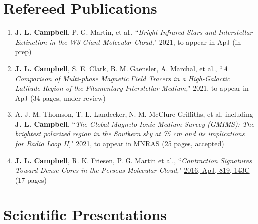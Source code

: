 \documentclass[10pt]{res} %
\begin{document}
\begin{resume}
\section{\Large Refereed Publications}
\vspace{-5pt} %
\noindent\makebox[\linewidth]{\rule{\textwidth}{0.4pt}}
\vspace{-15pt} %

\begin{enumerate}[{start=4,label=\arabic*.\addtocounter{enumi}{-2}}]
\itemsep-1em 
	\item \textbf{J. L. Campbell}, P. G. Martin, et al., ``\textit{Bright Infrared Stars and Interstellar Extinction in the W3 Giant Molecular Cloud,}" 2021, to appear in ApJ (in prep) \\
	\item \textbf{J. L. Campbell}, S. E. Clark, B. M. Gaensler, A. Marchal, et al., ``\textit{A Comparison of Multi-phase Magnetic Field Tracers in a High-Galactic Latitude Region of the Filamentary Interstellar Medium,}" 2021, to appear in ApJ (34 pages, under review) \\
	\item A. J. M. Thomson, T. L. Landecker, N. M. McClure-Griffiths, et al. including \textbf{J. L. Campbell}, ``\textit{The Global Magneto-Ionic Medium Survey (GMIMS): The brightest polarized region in the Southern sky at 75 cm and its implications for Radio Loop II,}" \href{https://ui.adsabs.harvard.edu/abs/2021arXiv210612595T/abstract}{2021, to appear in MNRAS} (25 pages, accepted) \\
	\item \textbf{J. L. Campbell}, R. K. Friesen, P. G. Martin et al., ``\textit{Contraction Signatures Toward Dense Cores in the Perseus Molecular Cloud,}" \href{https://ui.adsabs.harvard.edu/abs/2016ApJ...819..143C/abstract}{2016, ApJ, 819, 143C} (17 pages)
\end{enumerate}


\section{\Large Scientific Presentations}
\vspace{-5pt} %
\noindent\makebox[\linewidth]{\rule{\textwidth}{0.4pt}}
\vspace{-20pt} %


\end{resume}
\end{document}
